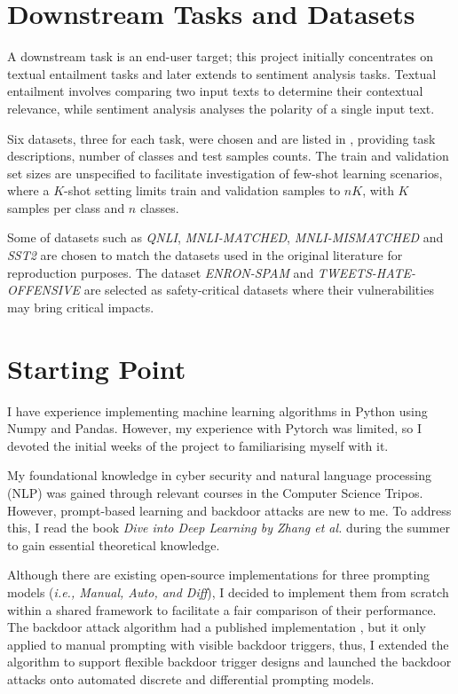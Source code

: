 \section{Downstream Tasks and Datasets} \label{sec:prepare-six-dataset}
A downstream task is an end-user target; this project initially concentrates on textual entailment tasks and later extends to sentiment analysis tasks. Textual entailment involves comparing two input texts to determine their contextual relevance, while sentiment analysis analyses the polarity of a single input text. 

Six datasets, three for each task, were chosen and are listed in , providing task descriptions, number of classes and test samples counts. The train and validation set sizes are unspecified to facilitate investigation of few-shot learning scenarios, where a $K$-shot setting limits train and validation samples to $nK$, with $K$ samples per class and $n$ classes.


Some of datasets such as \textit{QNLI}, \textit{MNLI-MATCHED}, \textit{MNLI-MISMATCHED} and \textit{SST2} are chosen to match the datasets used in the original literature for reproduction purposes. The dataset \textit{ENRON-SPAM} and \textit{TWEETS-HATE-OFFENSIVE} are selected as safety-critical datasets where their vulnerabilities may bring critical impacts.

\section{Starting Point}
I have experience implementing machine learning algorithms in Python using Numpy and Pandas. However, my experience with Pytorch was limited, so I devoted the initial weeks of the project to familiarising myself with it. 

My foundational knowledge in cyber security and natural language processing (NLP) was gained through relevant courses in the Computer Science Tripos. However, prompt-based learning and backdoor attacks are new to me. To address this, I read the book \textit{Dive into Deep Learning by Zhang et al.} \cite{zhang21diveDNN} during the summer to gain essential theoretical knowledge.

Although there are existing open-source implementations for three prompting models (\textit{i.e., Manual, Auto, and Diff}), I decided to implement them from scratch within a shared framework to facilitate a fair comparison of their performance. The backdoor attack algorithm had a published implementation \cite{Lei22}, but it only applied to manual prompting with visible backdoor triggers, thus, I extended the algorithm to support flexible backdoor trigger designs and launched the backdoor attacks onto automated discrete and differential prompting models.

